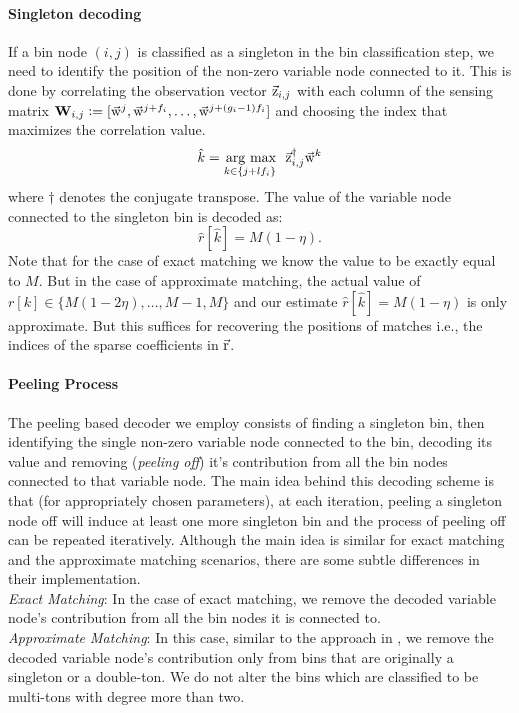 \paragraph*{Singleton decoding}
If a bin node $(i,j)$ is classified as a singleton in the bin classification step, we need to identify the position of the non-zero variable node connected to it. This is done by correlating the observation vector $\vec{\mathrm{z}}_{i,j}$ with each column of the sensing matrix  $\mathbf{W}_{i,j} \mathrel{\mathop:}= [\vec{\mathrm{w}}^{j},\vec{\mathrm{w}}^{j+f_i},\ldots,   \vec{\mathrm{w}}^{j+(g_i-1)f_i}]$ and choosing the index that maximizes the correlation value.
\begin{align*}
 \hat{k} = \underset{k\in\{j+l f_i\}}{\operatorname*{\,arg\ max}}~~ \vec{\mathrm{z}}^{\dagger}_{i,j} \vec{\mathrm{w}}^{k}
\end{align*}
where $\dagger$ denotes the conjugate transpose. The value of the variable node connected to the singleton bin is decoded as:
 $$
 \hat{r}[\hat{k}]=M(1-\eta).
 $$
 Note that for the case of exact matching we know the value to be exactly equal to $M$. But in the case of approximate matching, the actual value of $r[k]\in\{M(1-2\eta),\ldots,M-1,M\}$ and our estimate $\hat{r}[\hat{k}]=M(1-\eta)$ is only approximate. But this suffices for recovering the positions of matches i.e., the indices of the sparse coefficients in $\vec{\mathrm{r}}$.			

\paragraph*{Peeling Process} The peeling based decoder we employ consists of finding a singleton bin, then identifying the single non-zero variable node connected to the bin, decoding its value and removing ({\it peeling off}) it's contribution from all the bin nodes connected to that variable node. The main idea behind this decoding scheme is that (for appropriately chosen parameters), at each iteration, peeling a singleton node off will induce at least one more singleton bin and the process of peeling off can be repeated iteratively. Although the main idea is similar for exact matching and the approximate matching scenarios, there are some subtle differences in their implementation.\\
{\it Exact Matching}: In the case of exact matching, we remove the decoded variable node's contribution from all the bin nodes it is connected to.\\
{\it Approximate Matching}: In this case, similar to the approach in \cite{lee2015saffron},  we remove the decoded variable node's contribution only from bins that are originally a singleton or a double-ton. We do not alter the bins which are classified to be multi-tons with degree more than two.

